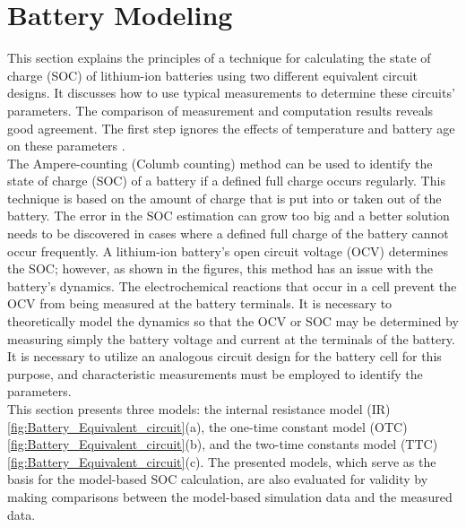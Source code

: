 \section{Battery Modeling}\label{sec:Batt_Modeling}
This section explains the principles of a technique for calculating the state of charge (SOC) of lithium-ion batteries using two different equivalent circuit designs. It discusses how to use typical measurements to determine these circuits' parameters. The comparison of measurement and computation results reveals good agreement. The first step ignores the effects of temperature and battery age on these parameters \cite{UKEMPT_AHMAD2012}.
\\
The Ampere-counting (Columb counting) method can be used to identify the state of charge (SOC) of a battery if a defined full charge occurs regularly. This technique is based on the amount of charge that is put into or taken out of the battery. The error in the SOC estimation can grow too big and a better solution needs to be discovered in cases where a defined full charge of the battery cannot occur frequently.
A lithium-ion battery's open circuit voltage (OCV) determines the SOC; however, as shown in the figures, this method has an issue with the battery's dynamics.
The electrochemical reactions that occur in a cell prevent the OCV from being measured at the battery terminals. It is necessary to theoretically model the dynamics so that the OCV or SOC may be determined by measuring simply the battery voltage and current at the terminals of the battery. It is necessary to utilize an analogous circuit design for the battery cell for this purpose, and characteristic measurements must be employed to identify the parameters.
\\
This section presents three models: the internal resistance model (IR)\ref{fig:Battery_Equivalent_circuit}(a), the one-time constant model (OTC) \ref{fig:Battery_Equivalent_circuit}(b), and the two-time constants model (TTC) \ref{fig:Battery_Equivalent_circuit}(c). The presented models, which serve as the basis for the model-based SOC calculation, are also evaluated for validity by making comparisons between the model-based simulation data and the measured data\cite{UniPadua_Giacomo}.

